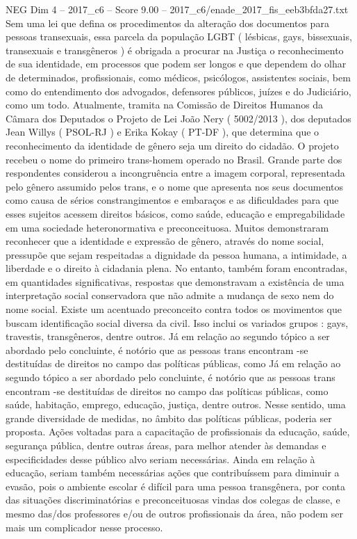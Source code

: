 \begin{textsample}{NEG Dim 4 – 2017\_c6 – Score 9.00 – 2017\_c6/enade\_2017\_fis\_eeb3bfda27.txt}
Sem uma lei que defina os procedimentos da alteração dos documentos para pessoas transexuais, essa parcela da população LGBT ( lésbicas, gays, bissexuais, transexuais e transgêneros ) é obrigada a procurar na Justiça o reconhecimento de sua identidade, em processos que podem ser longos e que dependem do olhar de determinados, profissionais, como médicos, psicólogos, assistentes sociais, bem como do entendimento dos advogados, defensores públicos, juízes e do Judiciário, como um todo.
Atualmente, tramita na Comissão de Direitos Humanos da Câmara dos Deputados o Projeto de Lei João Nery ( 5002/2013 ), dos deputados Jean Willys ( PSOL-RJ ) e Erika Kokay ( PT-DF ), que determina que o reconhecimento da identidade de gênero seja um direito do cidadão.
O projeto recebeu o nome do primeiro trans-homem operado no Brasil.
Grande parte dos respondentes considerou a incongruência entre a imagem corporal, representada pelo gênero assumido pelos trans, e o nome que apresenta nos seus documentos como causa de sérios constrangimentos e embaraços e as dificuldades para que esses sujeitos acessem direitos básicos, como saúde, educação e empregabilidade em uma sociedade heteronormativa e preconceituosa.
Muitos demonstraram reconhecer que a identidade e expressão de gênero, através do nome social, pressupõe que sejam respeitadas a dignidade da pessoa humana, a intimidade, a liberdade e o direito à cidadania plena.
No entanto, também foram encontradas, em quantidades significativas, respostas que demonstravam a existência de uma interpretação social conservadora que não admite a mudança de sexo nem do nome social.
Existe um acentuado preconceito contra todos os movimentos que buscam identificação social diversa da civil.
Isso inclui os variados grupos : gays, travestis, transgêneros, dentre outros.
Já em relação ao segundo tópico a ser abordado pelo concluinte, é notório que as pessoas trans encontram -se destituídas de direitos no campo das políticas públicas, como Já em relação ao segundo tópico a ser abordado pelo concluinte, é notório que as pessoas trans encontram -se destituídas de direitos no campo das políticas públicas, como saúde, habitação, emprego, educação, justiça, dentre outros.
Nesse sentido, uma grande diversidade de medidas, no âmbito das políticas públicas, poderia ser proposta.
Ações voltadas para a capacitação de profissionais da educação, saúde, segurança pública, dentre outras áreas, para melhor atender às demandas e especificidades desse público alvo seriam necessárias.
Ainda em relação à educação, seriam também necessárias ações que contribuíssem para diminuir a evasão, pois o ambiente escolar é difícil para uma pessoa transgênera, por conta das situações discriminatórias e preconceituosas vindas dos colegas de classe, e mesmo das/dos professores e/ou de outros profissionais da área, não podem ser mais um complicador nesse processo.

\end{textsample}
